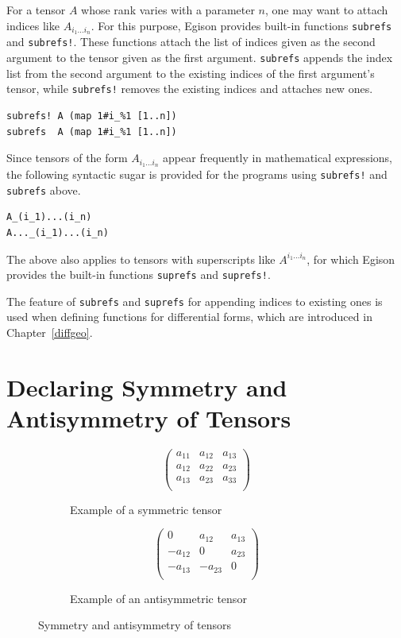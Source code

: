 For a tensor $A$ whose rank varies with a parameter $n$, one may want to attach indices like $A_{i_{1}...i_{n}}$.
For this purpose, Egison provides built-in functions \lstinline{subrefs} and \lstinline{subrefs!}.
These functions attach the list of indices given as the second argument to the tensor given as the first argument.
\lstinline{subrefs} appends the index list from the second argument to the existing indices of the first argument's tensor, while \lstinline{subrefs!} removes the existing indices and attaches new ones.
\begin{lstlisting}[language=egison,numbers=none]
subrefs! A (map 1#i_%1 [1..n])
subrefs  A (map 1#i_%1 [1..n])
\end{lstlisting}
Since tensors of the form $A_{i_{1}...i_{n}}$ appear frequently in mathematical expressions, the following syntactic sugar is provided for the programs using \lstinline{subrefs!} and \lstinline{subrefs} above.
\begin{lstlisting}[language=egison,numbers=none]
A_(i_1)...(i_n)
A..._(i_1)...(i_n)
\end{lstlisting}
The above also applies to tensors with superscripts like $A^{i_{1}...i_{n}}$, for which Egison provides the built-in functions \lstinline{suprefs} and \lstinline{suprefs!}.

The feature of \lstinline{subrefs} and \lstinline{suprefs} for appending indices to existing ones is used when defining functions for differential forms, which are introduced in Chapter~\ref{diffgeo}.

\section{Declaring Symmetry and Antisymmetry of Tensors}\label{tensor-symm}

\begin{figure}[t]
 \begin{subfigure}[b]{1.0\linewidth}
$$
\begin{pmatrix}
a_{11} & a_{12} & a_{13} \\
a_{12} & a_{22} & a_{23} \\
a_{13} & a_{23} & a_{33} \\
\end{pmatrix}
$$
  \caption{Example of a symmetric tensor}
  \label{fig:symmtensor}
 \end{subfigure}
  \medskip
 \begin{subfigure}[b]{1.0\linewidth}
$$
\begin{pmatrix}
0 & a_{12} & a_{13} \\
-a_{12} & 0 & a_{23} \\
-a_{13} & -a_{23} & 0 \\
\end{pmatrix}
$$
  \caption{Example of an antisymmetric tensor}
  \label{fig:antisymmtensor}
 \end{subfigure}
 \caption{Symmetry and antisymmetry of tensors}
 \label{fig:symm}
\end{figure}


